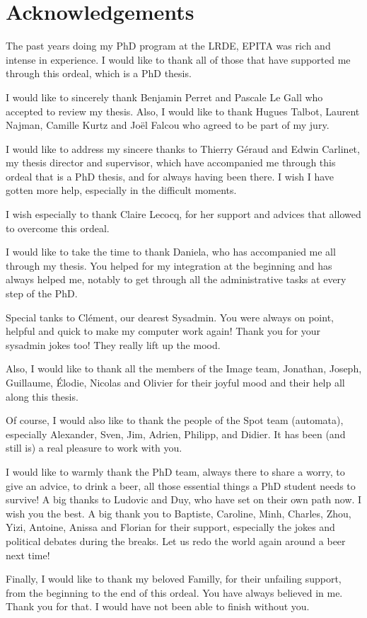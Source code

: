 \section*{Acknowledgements}
\label{sec:acknowledgement}

The past years doing my PhD program at the LRDE, EPITA was rich and intense in experience. I would like to thank all of
those that have supported me through this ordeal, which is a PhD thesis.

I would like to sincerely thank Benjamin Perret and Pascale Le Gall who accepted to review my thesis. Also, I would like
to thank Hugues Talbot, Laurent Najman, Camille Kurtz and Jo\"{e}l Falcou who agreed to be part of my jury.

I would like to address my sincere thanks to Thierry Géraud and Edwin Carlinet, my thesis director and supervisor, which
have accompanied me through this ordeal that is a PhD thesis, and for always having been there. I wish I have gotten
more help, especially in the difficult moments.

I wish especially to thank Claire Lecocq, for her support and advices that allowed to overcome this ordeal.

I would like to take the time to thank Daniela, who has accompanied me all through my thesis. You helped for my
integration at the beginning and has always helped me, notably to get through all the administrative tasks at every
step of the PhD.

Special tanks to Cl\'{e}ment, our dearest Sysadmin. You were always on point, helpful and quick to make my computer work
again! Thank you for your sysadmin jokes too! They really lift up the mood.

Also, I would like to thank all the members of the Image team, Jonathan, Joseph, Guillaume, \'{E}lodie, Nicolas and
Olivier for their joyful mood and their help all along this thesis.

Of course, I would also like to thank the people of the Spot team (automata), especially Alexander, Sven, Jim, Adrien,
Philipp, and Didier. It has been (and still is) a real pleasure to work with you.

I would like to warmly thank the PhD team, always there to share a worry, to give an advice, to drink a beer, all those
essential things a PhD student needs to survive! A big thanks to Ludovic and Duy, who have set on their own path now. I
wish you the best. A big thank you to Baptiste, Caroline, Minh, Charles, Zhou, Yizi, Antoine, Anissa and Florian for
their support, especially the jokes and political debates during the breaks. Let us redo the world again around a beer
next time!

Finally, I would like to thank my beloved Familly, for their unfailing support, from the beginning to the end of this
ordeal. You have always believed in me. Thank you for that. I would have not been able to finish without you.

